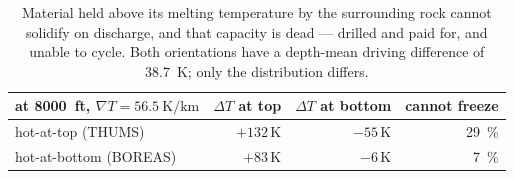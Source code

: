 \begin{table}[h]
\centering
\begin{tabular}{lrrr}
\toprule
at \SI{8000}{ft}, $\nabla T = \SI{56.5}{\kelvin\per\kilo\metre}$
 & $\Delta T$ at top & $\Delta T$ at bottom & cannot freeze \\
\midrule
hot-at-top (THUMS)     & $+132$\,K & $-55$\,K & \SI{29}{\percent} \\
hot-at-bottom (BOREAS) & $+83$\,K  & $-6$\,K  & \SI{7}{\percent}  \\
\bottomrule
\end{tabular}
\caption{Material held above its melting temperature by the surrounding rock
cannot solidify on discharge, and that capacity is dead --- drilled and paid
for, and unable to cycle. Both orientations have a depth-mean driving
difference of \SI{38.7}{\kelvin}; only the distribution differs.}
\end{table}


